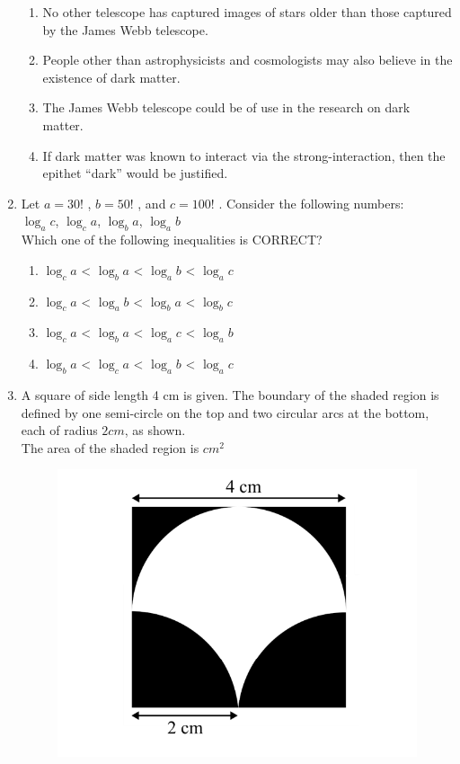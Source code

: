 \documentclass[journal,12pt,onecolumn]{IEEEtran}
\theoremstyle{remark}
\begin{document}
\begin{enumerate}
\hfill{}
\begin{enumerate}
\item No other telescope has captured images of stars older than those captured by the James Webb telescope.
\item People other than astrophysicists and cosmologists may also believe in the existence of dark matter.
\item The James Webb telescope could be of use in the research on dark matter.
\item If dark matter was known to interact via the strong-interaction, then the epithet “dark” would be justified.
\end{enumerate}

\item Let $a = 30!$ , $b = 50!$ , and $c = 100!$ . Consider the following numbers:\\
$\log_{a}c$,\hspace{2cm} $\log_{c}a$,\hspace{2cm} $\log_{b}a$, \hspace{2cm} $\log_{a}b$\\
Which one of the following inequalities is CORRECT?

\hfill{}
\begin{enumerate}
\item $\log_{c}a$ < $\log_{b}a$ < $\log_{a}b$ < $\log_{a}c$
\item $\log_{c}a$ < $\log_{a}b$ < $\log_{b}a$ < $\log_{b}c$
\item $\log_{c}a$ < $\log_{b}a$ < $\log_{a}c$ < $\log_{a}b$
\item $\log_{b}a$ < $\log_{c}a$ < $\log_{a}b$ < $\log_{a}c$
\end{enumerate}

\item A square of side length 4 cm is given. The boundary of the shaded region is defined by one semi-circle on the top and two circular arcs at the bottom, each of radius $2 cm$, as shown.\\
The area of the shaded region is \underline{\hspace{2cm}}$cm^2$

\hfill{}
\begin{figure}[H]
\centering
\includegraphics[width = 0.5\columnwidth]{figs/q10.png}
\caption*{}
\label{fig:Q.10}
\end{figure}


\end{enumerate}
\end{document}
